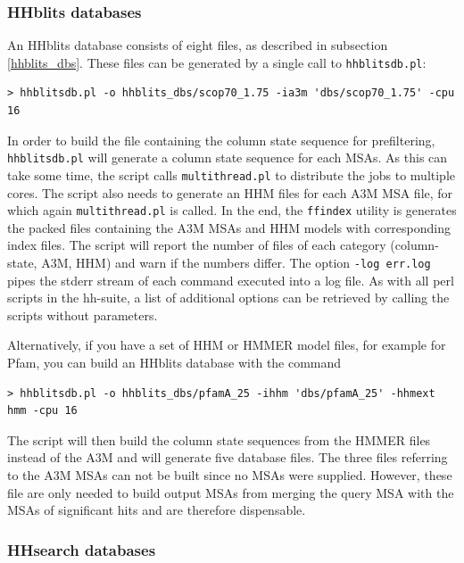 \documentclass[11pt,a4paper]{article}
\begin{document}
\subsubsection*{HHblits databases}

An HHblits database consists of eight files, as described in subsection \ref{hhblits_dbs}. These files can be generated by a single call to \verb`hhblitsdb.pl`:
\begin{verbatim}
> hhblitsdb.pl -o hhblits_dbs/scop70_1.75 -ia3m 'dbs/scop70_1.75' -cpu 16
\end{verbatim}
In order to build the file containing the column state sequence for prefiltering, \verb`hhblitsdb.pl` will generate a column state sequence for each MSAs. As this can take some time, the script calls \verb`multithread.pl` to distribute the jobs to multiple cores. The script also needs to generate an HHM files for each A3M MSA file, for which again \verb`multithread.pl` is called. In the end, the \verb`ffindex` utility is generates the packed files containing the A3M MSAs and HHM models with corresponding index files. The script will report the number of files of each category (column-state, A3M, HHM) and warn if the numbers differ. The option \verb`-log err.log` pipes the stderr stream of each command executed into a log file. As with all perl scripts in the hh-suite, a list of additional options can be retrieved by calling the scripts without parameters.

Alternatively, if you have a set of HHM or HMMER model files, for example for Pfam, you can build an HHblits database with the command
\begin{verbatim}
> hhblitsdb.pl -o hhblits_dbs/pfamA_25 -ihhm 'dbs/pfamA_25' -hhmext hmm -cpu 16
\end{verbatim}
The script will then build the column state sequences from the HMMER files instead of the A3M and will generate five database files. The three files referring to the A3M MSAs can not be built since no MSAs were supplied. However, these file are only needed to build output MSAs from merging the query MSA with the MSAs of significant hits and are therefore dispensable.


\subsubsection*{HHsearch databases}
\end{document}
